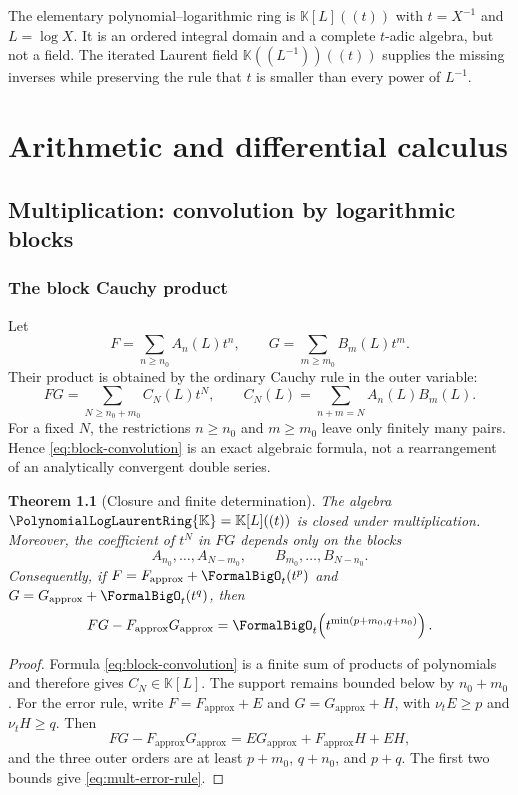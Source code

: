 \documentclass[11pt,oneside]{book}
\newtheorem{theorem}{Theorem}[chapter]
\theoremstyle{definition}
\theoremstyle{remark}
\newcommand{\K}{\mathbb K}
\newcommand{\PLpoly}{\PolynomialLogLaurentRing{\K}}
\newcommand{\ApproximationOf}[1]{#1_{\mathrm{approx}}}
\begin{document}
\begin{summarybox}
The elementary polynomial--logarithmic ring is $\K[L]((t))$ with
$t=X^{-1}$ and $L=\log X$.  It is an ordered integral domain and a complete
$t$-adic algebra, but not a field.  The iterated Laurent field
$\K((L^{-1}))((t))$ supplies the missing inverses while preserving the rule
that $t$ is smaller than every power of $L^{-1}$.
\end{summarybox}

\part{Arithmetic and differential calculus}

\chapter{Multiplication: convolution by logarithmic blocks}
\label{ch:multiplication}

\section{The block Cauchy product}
Let
\begin{equation}\label{eq:FG-blocks}
 F=\sum_{n\ge n_0}A_n(L)t^n,
 \qquad
 G=\sum_{m\ge m_0}B_m(L)t^m.
\end{equation}
Their product is obtained by the ordinary Cauchy rule in the outer variable:
\begin{equation}\label{eq:block-convolution}
 FG=\sum_{N\ge n_0+m_0}C_N(L)t^N,
 \qquad
 C_N(L)=\sum_{n+m=N}A_n(L)B_m(L).
\end{equation}
For a fixed $N$, the restrictions $n\ge n_0$ and $m\ge m_0$ leave only
finitely many pairs.  Hence \eqref{eq:block-convolution} is an exact algebraic
formula, not a rearrangement of an analytically convergent double series.

\begin{theorem}[Closure and finite determination]\label{thm:mult-closure}
The algebra $\PLpoly=\K[L]((t))$ is closed under multiplication.  Moreover,
the coefficient of $t^N$ in $FG$ depends only on the blocks
\[
 A_{n_0},\ldots,A_{N-m_0},
 \qquad
 B_{m_0},\ldots,B_{N-n_0}.
\]
Consequently, if
$F=\ApproximationOf{F}+\FormalBigO_t(t^{p})$ and
$G=\ApproximationOf{G}+\FormalBigO_t(t^{q})$, then
\begin{equation}\label{eq:mult-error-rule}
 FG-\ApproximationOf{F}\ApproximationOf{G}
 =\FormalBigO_t\!\left(t^{\min(p+m_0,q+n_0)}\right).
\end{equation}
\end{theorem}
\begin{proof}
Formula \eqref{eq:block-convolution} is a finite sum of products of
polynomials and therefore gives $C_N\in\K[L]$.  The support remains bounded
below by $n_0+m_0$.  For the error rule, write
$F=\ApproximationOf{F}+E$ and $G=\ApproximationOf{G}+H$, with
$\nu_tE\ge p$ and $\nu_tH\ge q$.  Then
\[
 FG-\ApproximationOf{F}\ApproximationOf{G}=E\ApproximationOf{G}+\ApproximationOf{F} H+EH,
\]
and the three outer orders are at least $p+m_0$, $q+n_0$, and $p+q$.
The first two bounds give \eqref{eq:mult-error-rule}.
\end{proof}
\end{document}
